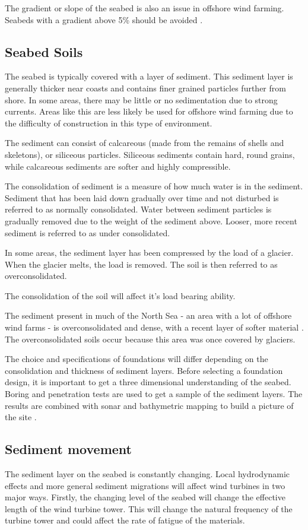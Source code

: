 \documentclass[12pt]{article} %
\begin{document}
The gradient or slope of the seabed is also an issue in offshore wind farming. Seabeds with a gradient above 5\% should be avoided \cite{antonio_pantaleo_feasibility_2005}.

\subsection{Seabed Soils}
The seabed is typically covered with a layer of sediment. This sediment layer is generally thicker near coasts and contains finer grained particles further from shore.
In some areas, there may be little or no sedimentation due to strong currents. Areas like this are less likely be used for offshore wind farming due to the difficulty of construction in this type of environment.

The sediment can consist of calcareous (made from the remains of shells and skeletons), or siliceous particles. Siliceous sediments contain hard, round grains, while calcareous sediments are softer and highly compressible.

The consolidation of sediment is a measure of how much water is in the sediment. Sediment that has been laid down gradually over time and not disturbed is referred to as normally consolidated. Water between sediment particles is gradually removed due to the weight of the sediment above.
Looser, more recent sediment is referred to as under consolidated.

In some areas, the sediment layer has been compressed by the load of a glacier. When the glacier melts, the load is removed. The soil is then referred to as overconsolidated. 

The consolidation of the soil will affect it's load bearing ability.

The sediment present in much of the North Sea - an area with a lot of offshore wind farms - is overconsolidated and dense, with a recent layer of softer material \cite{randolph_offshore_2011}. The overconsolidated soils occur because this area was once covered by glaciers.

The choice and specifications of foundations will differ depending on the consolidation and thickness of sediment layers.
Before selecting a foundation design, it is important to get a three dimensional understanding of the seabed. Boring and penetration tests are used to get a sample of the sediment layers. The results are combined with sonar and bathymetric mapping to build a picture of the site \cite{thornton}.

\subsection{Sediment movement}
The sediment layer on the seabed is constantly changing. Local hydrodynamic effects and more general sediment migrations will affect wind turbines in two major ways. Firstly, the changing level of the seabed will change the effective length of the wind turbine tower. This will change the natural frequency of the turbine tower and could affect the rate of fatigue of the materials.
\end{document}
